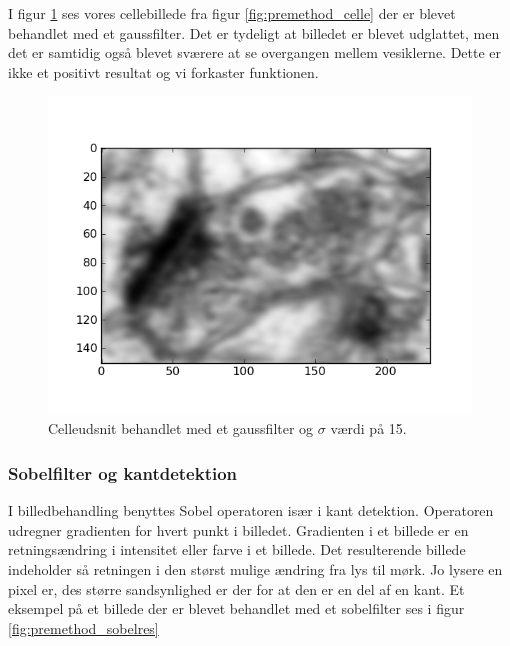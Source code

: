 I figur \ref{fig:premethod_GaussCelle} ses vores cellebillede fra figur \ref{fig:premethod_celle} der er blevet behandlet med et gaussfilter. Det er tydeligt at billedet er blevet udglattet, men det er samtidig også blevet sværere at se overgangen mellem vesiklerne. Dette er ikke et positivt resultat og vi forkaster funktionen.

\begin{figure}[H]
	\centering
	\includegraphics[scale=0.8]{files/premethod/img/gausscell.png}
	\caption{Celleudsnit behandlet med et gaussfilter og $\sigma$ værdi på 15.\label{fig:premethod_GaussCelle}}
\end{figure}


\subsubsection{Sobelfilter og kantdetektion}
I billedbehandling benyttes Sobel operatoren især i kant detektion. Operatoren udregner gradienten for hvert punkt i billedet. Gradienten i et billede er en retningsændring i intensitet eller farve i et billede. Det resulterende billede indeholder så retningen i den størst mulige ændring fra lys til mørk. Jo lysere en pixel er, des større sandsynlighed er der for at den er en del af en kant. Et eksempel på et billede der er blevet behandlet med et sobelfilter ses i figur \ref{fig:premethod_sobelres}

